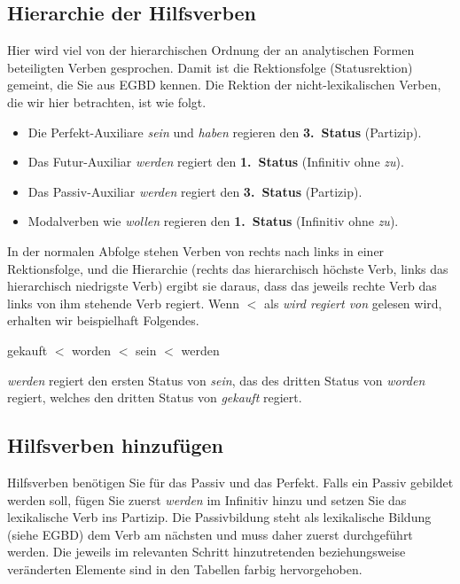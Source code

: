 \subsection{Hierarchie der Hilfsverben}

Hier wird viel von der hierarchischen Ordnung der an analytischen Formen beteiligten Verben gesprochen.
Damit ist die Rektionsfolge (Statusrektion) gemeint, die Sie aus EGBD kennen.
Die Rektion der nicht-lexikalischen Verben, die wir hier betrachten, ist wie folgt.

\begin{itemize}\Lf
  \item Die Perfekt-Auxiliare \textit{sein} und \textit{haben} regieren den \textbf{3.~Status} (Partizip).
  \item Das Futur-Auxiliar \textit{werden} regiert den \textbf{1.~Status} (Infinitiv ohne \textit{zu}).
  \item Das Passiv-Auxiliar \textit{werden} regiert den \textbf{3.~Status} (Partizip).
  \item Modalverben wie \textit{wollen} regieren den \textbf{1.~Status} (Infinitiv ohne \textit{zu}).
\end{itemize}

In der normalen Abfolge stehen Verben von rechts nach links in einer Rektionsfolge, und die Hierarchie (rechts das hierarchisch höchste Verb, links das hierarchisch niedrigste Verb) ergibt sie daraus, dass das jeweils rechte Verb das links von ihm stehende Verb regiert.
Wenn $<$ als \textit{wird regiert von} gelesen wird, erhalten wir beispielhaft Folgendes.

\begin{center}
  gekauft $<$ worden $<$ sein $<$ werden
\end{center}

\textit{werden} regiert den ersten Status von \textit{sein}, das des dritten Status von \textit{worden} regiert, welches den dritten Status von \textit{gekauft} regiert.

\subsection{Hilfsverben hinzufügen}
\label{sec:hilfsverben}

Hilfsverben benötigen Sie für das Passiv und das Perfekt.
Falls ein Passiv gebildet werden soll, fügen Sie zuerst \textit{werden} im Infinitiv hinzu und setzen Sie das lexikalische Verb ins Partizip.
Die Passivbildung steht als lexikalische Bildung (siehe EGBD) dem Verb am nächsten und muss daher zuerst durchgeführt werden.
Die jeweils im relevanten Schritt hinzutretenden beziehungsweise veränderten Elemente sind in den Tabellen farbig hervorgehoben.

